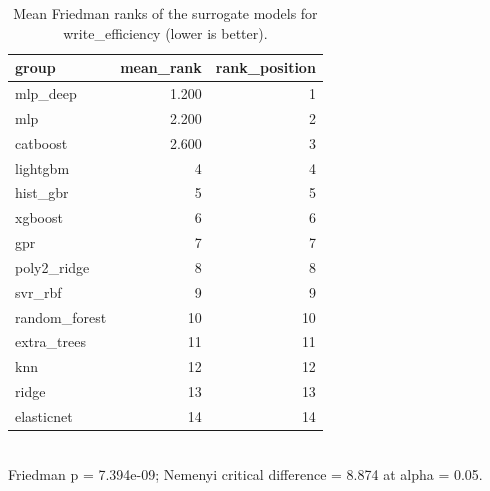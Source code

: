 \begin{table}[!t]
\centering
\caption{Mean Friedman ranks of the surrogate models for write_efficiency (lower is better).}
\label{tab:statistics_surrogate_ranks_surrogate_write_efficiency}
\footnotesize
\begin{tabular}{lrr}
\toprule
group & mean\_rank & rank\_position \\
\midrule
mlp\_deep & 1.200 & 1 \\
mlp & 2.200 & 2 \\
catboost & 2.600 & 3 \\
lightgbm & 4 & 4 \\
hist\_gbr & 5 & 5 \\
xgboost & 6 & 6 \\
gpr & 7 & 7 \\
poly2\_ridge & 8 & 8 \\
svr\_rbf & 9 & 9 \\
random\_forest & 10 & 10 \\
extra\_trees & 11 & 11 \\
knn & 12 & 12 \\
ridge & 13 & 13 \\
elasticnet & 14 & 14 \\
\bottomrule
\end{tabular}
\\[2pt] \footnotesize Friedman p = 7.394e-09; Nemenyi critical difference = 8.874 at alpha = 0.05.
\end{table}
